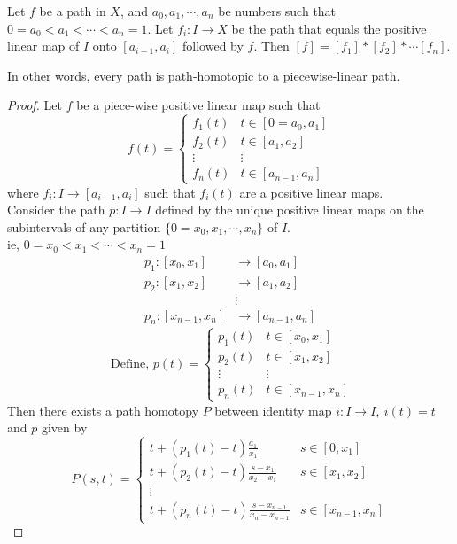 \begin{theorem}
	Let $f$ be a path in $X$, and $a_0, a_1, \cdots, a_n$ be numbers such that $0 = a_0 < a_1 < \cdots < a_n = 1$. Let $f_i : I \to X$ be the path that equals the positive linear map of $I$ onto $[a_{i-1},a_i]$ followed by $f$. Then $[f] = [f_1]\ast{}[f_2]\ast{}\cdots[f_n]$.
	\begin{commentary}In other words, every path is path-homotopic to a piecewise-linear path.\end{commentary}
\end{theorem}
\begin{proof}
	Let $f$ be a piece-wise positive linear map such that
	\[ f(t) = \begin{cases} f_1(t) & t \in [0=a_0,a_1] \\ f_2(t) & t \in [a_1,a_2] \\ \vdots & \vdots \\ f_n(t) & t \in [a_{n-1},a_n] \end{cases} \]
	where $f_i : I \to [a_{i-1},a_i]$ such that $f_i(t)$ are a positive linear maps. \\

	Consider the path $p : I \to I$  defined by the unique positive linear maps on the subintervals of any partition $\{ 0 = x_0, x_1, \cdots, x_n \}$ of $I$. \\
	ie, $0 = x_0 < x_1 < \cdots < x_n=1$
	\begin{align*}
		p_1 : [x_0,x_1] & \to [a_0,a_1] \\
		p_2 : [x_1,x_2] & \to [a_1,a_2] \\
		& \vdots \\
		p_n : [x_{n-1},x_n] & \to [a_{n-1},a_n]
	\end{align*}
	\[ \text{ Define, } p(t) = \begin{cases} p_1(t) & t \in [x_0,x_1] \\ p_2(t) & t \in [x_1,x_2] \\  \vdots  & \vdots \\ p_n(t) & t \in [x_{n-1},x_n]\end{cases} \]
	Then there exists a path homotopy $P$ between identity map $i : I \to I,\ i(t) = t$  and $p$ given by
	\[ P(s,t) = \begin{cases} t + (p_1(t)-t)\frac{a_1}{x_1} & s \in [0,x_1] \\ t + (p_2(t)-t)\frac{s-x_1}{x_2-x_1} & s \in [x_1,x_2] \\ \vdots & \\ t + (p_n(t)-t)\frac{s-x_{n-1}}{x_n - x_{n-1}} & s \in [x_{n-1},x_n] \end{cases} \]
	

\end{proof}
